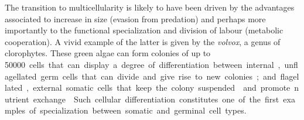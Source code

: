 \documentclass{tufte-book}
\begin{document}
The transition to multicellularity is likely to have been driven by the
advantages associated to increase in size (evasion from predation) and perhaps
more importantly to the functional specialization and division of labour
(metabolic cooperation).  A vivid example of the latter is given by the
\emph{volvox}, a genus of clorophytes.  These green algae can form colonies of
up to \SI{50000} cells that can display a degree of differentiation between
internal, unflagellated germ cells that can divide and give rise to new colonies;
and flagellated, external somatic cells that keep the colony
suspended\cite{kirk_volvox:_2005} and promote nutrient
exchange.\cite{solari_multicellularity_2006}  Such cellular differentiation
constitutes one of the first examples of specialization between somatic and
germinal cell types.












\end{document}
